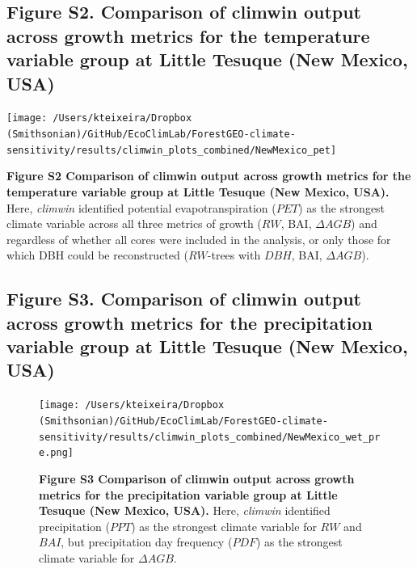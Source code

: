 \documentclass[
]{article}
\begin{document}
\newpage

\hypertarget{figure-s2.-comparison-of-climwin-output-across-growth-metrics-for-the-temperature-variable-group-at-little-tesuque-new-mexico-usa}{%
\subsection{Figure S2. Comparison of climwin output across growth
metrics for the temperature variable group at Little Tesuque (New
Mexico,
USA)}\label{figure-s2.-comparison-of-climwin-output-across-growth-metrics-for-the-temperature-variable-group-at-little-tesuque-new-mexico-usa}}

\begin{center}\texttt{[image: /Users/kteixeira/Dropbox (Smithsonian)/GitHub/EcoClimLab/ForestGEO-climate-sensitivity/results/climwin\_plots\_combined/NewMexico\_pet]} \end{center}

\textbf{Figure S2 \textbar{} Comparison of climwin output across growth
metrics for the temperature variable group at Little Tesuque (New
Mexico, USA).} Here, \emph{climwin} identified potential
evapotranspiration (\(PET\)) as the strongest climate variable across
all three metrics of growth (\(RW\), BAI, \(\Delta AGB\)) and regardless
of whether all cores were included in the analysis, or only those for
which DBH could be reconstructed (\(RW\)-trees with \(DBH\), BAI,
\(\Delta AGB\)).

\newpage

\hypertarget{figure-s3.-comparison-of-climwin-output-across-growth-metrics-for-the-precipitation-variable-group-at-little-tesuque-new-mexico-usa}{%
\subsection{Figure S3. Comparison of climwin output across growth
metrics for the precipitation variable group at Little Tesuque (New
Mexico,
USA)}\label{figure-s3.-comparison-of-climwin-output-across-growth-metrics-for-the-precipitation-variable-group-at-little-tesuque-new-mexico-usa}}

\begin{figure}
\centering
\texttt{[image: /Users/kteixeira/Dropbox (Smithsonian)/GitHub/EcoClimLab/ForestGEO-climate-sensitivity/results/climwin\_plots\_combined/NewMexico\_wet\_pre.png]}
\caption{\textbf{Figure S3 \textbar{} Comparison of climwin output
across growth metrics for the precipitation variable group at Little
Tesuque (New Mexico, USA).} Here, \emph{climwin} identified
precipitation (\(PPT\)) as the strongest climate variable for \(RW\) and
\(BAI\), but precipitation day frequency (\(PDF\)) as the strongest
climate variable for \(\Delta AGB\).}
\end{figure}
\end{document}
